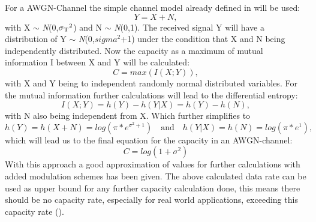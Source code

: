 For a \gls{AWGN}-Channel the simple channel model already defined in  will be used:
\begin{equation}
\label{eq:chanAWGN}
Y = X + N,   
\end{equation}
with X $\sim$ \textit{N}(0,$\sigma\textsubscript{T}^2$) and N $\sim$ \textit{N}(0,1). The received signal Y will have a distribution of Y $\sim$ \textit{N}(0,$sigma^2$+1) under the condition that X and N being independently distributed.
Now the capacity as a maximum of mutual information I between X and Y will be calculated:
\begin{equation}
\label{eq:cap}
C = max(I(X;Y)),     
\end{equation}
with X and Y being to independent randomly normal distributed variables.
\newline
For the mutual information further calculations will lead to the differential entropy:
\begin{equation}
I(X;Y) = h(Y) - h(Y|X)
= h(Y) - h(N),
\end{equation}
with N also being independent from X.
\newline
Which further simplifies to 
\begin{equation}
h(Y) = h(X+N) = log(\pi*e^{\sigma^2+1}) \quad \textrm{and} \quad h(Y|X) = h(N) = log(\pi*e^{1}),
\end{equation}
which will lead us to the final equation for the capacity in an AWGN-channel:
\begin{equation}
\label{eq:AWGNcap}
C = log(1+\sigma^2)
\end{equation}
With this approach a good approximation of values for further calculations with added modulation schemes has been given. The above calculated data rate can be used as upper bound for any further capacity calculation done, this means there should be no capacity rate, especially for real world applications, exceeding this capacity rate ().


